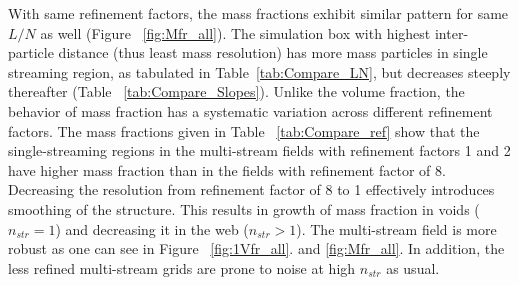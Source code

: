 With same refinement factors, the mass fractions exhibit similar pattern for same $L/N$ as well (Figure ~\ref{fig:Mfr_all}). The simulation box with highest inter-particle distance (thus least mass resolution) has more mass particles in single streaming region, as tabulated in Table~\ref{tab:Compare_LN}, but decreases steeply thereafter (Table ~\ref{tab:Compare_Slopes}). Unlike the volume fraction, the behavior of mass fraction has a systematic variation across different refinement factors. The mass fractions given in Table ~\ref{tab:Compare_ref} show that the single-streaming regions in the multi-stream fields with refinement factors 1 and 2 have higher mass fraction than in the fields with refinement factor of 8. Decreasing the resolution from refinement factor of 8 to 1 effectively introduces smoothing of the structure. This results in growth of mass fraction in voids ($n_{str} = 1$) and decreasing it in the web ($n_{str} > 1$). The multi-stream field is more robust as one can see in Figure ~\ref{fig:1Vfr_all}. and \ref{fig:Mfr_all}. In addition, the less refined multi-stream grids are prone to noise at high $n_{str}$ as usual.
